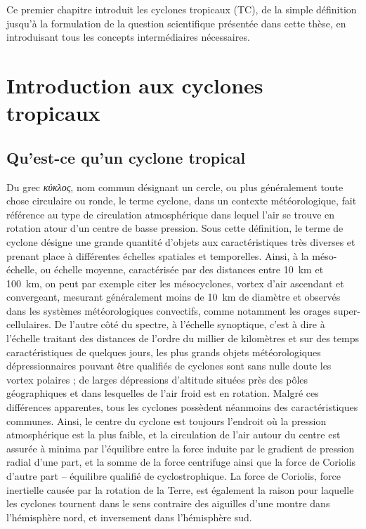 \documentclass[../main.tex]{subfiles}
\begin{document}
\begin{itshape}
Ce premier chapitre introduit les cyclones tropicaux (TC), de la simple définition jusqu'à la formulation de la question scientifique présentée dans cette thèse, en introduisant tous les concepts intermédiaires nécessaires.
\end{itshape}

\minitoc
\section{Introduction aux cyclones tropicaux}

\subsection{Qu'est-ce qu'un cyclone tropical}

Du grec \textit{κύκλος}, nom commun désignant un cercle, ou plus généralement toute chose circulaire ou ronde, le terme cyclone, dans un contexte météorologique, fait référence au type de circulation atmosphérique dans lequel l'air se trouve en rotation atour d'un centre de basse pression. Sous cette définition, le terme de cyclone désigne une grande quantité d'objets aux caractéristiques très diverses et prenant place à différentes échelles spatiales et temporelles. Ainsi, à la
méso-échelle, ou échelle moyenne, caractérisée par des distances entre \SI{10}{\kilo\metre} et \SI{100}{\kilo\metre}, on peut par exemple citer les mésocyclones, vortex d'air ascendant et convergeant, mesurant généralement moins de \SI{10}{\kilo\metre} de diamètre et observés dans les systèmes météorologiques convectifs, comme notamment les orages super-cellulaires. De l'autre côté du spectre, à l'échelle synoptique, c'est à dire à l'échelle traitant des distances de l'ordre du millier de kilomètres et sur des
temps caractéristiques de quelques jours, les plus grands objets météorologiques dépressionnaires pouvant être qualifiés de cyclones sont sans
nulle doute les vortex polaires ; de larges dépressions d'altitude situées près des pôles géographiques et dans lesquelles de l'air froid est en rotation. Malgré ces différences apparentes, tous les cyclones possèdent néanmoins des caractéristiques communes. Ainsi, le centre du cyclone est toujours l'endroit où la pression atmosphérique est la plus faible, et la circulation de l'air autour du centre est assurée à minima par l'équilibre entre la force induite par le gradient de pression radial d'une part, et la somme
de la force centrifuge ainsi que la force de Coriolis d'autre part -- équilibre qualifié de cyclostrophique. La force de Coriolis, force inertielle causée par la rotation de la Terre, est également la raison pour laquelle les cyclones tournent dans le sens contraire des aiguilles d'une montre dans l'hémisphère nord, et inversement dans l'hémisphère sud.
\end{document}
